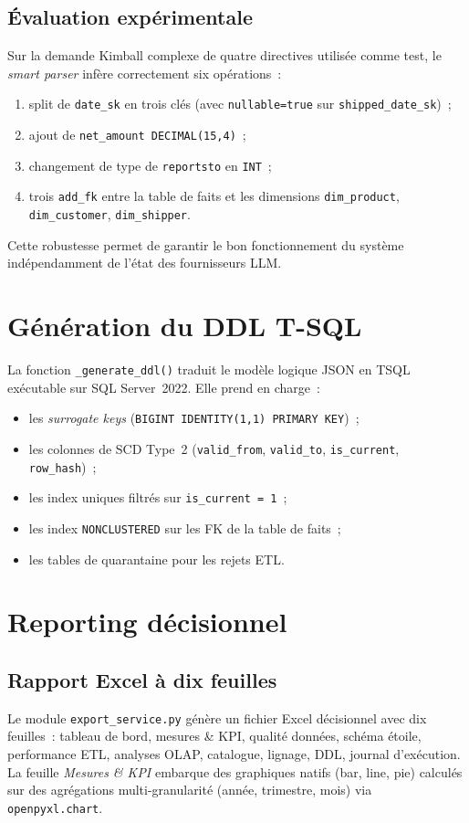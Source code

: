 \documentclass[12pt, a4paper]{report}
\begin{document}
\subsection{Évaluation expérimentale}
Sur la demande Kimball complexe de quatre directives utilisée comme
test, le \emph{smart parser} infère correctement six opérations~:
\begin{enumerate}
  \item split de \texttt{date\_sk} en trois clés (avec
        \texttt{nullable=true} sur \texttt{shipped\_date\_sk})~;
  \item ajout de \texttt{net\_amount DECIMAL(15,4)}~;
  \item changement de type de \texttt{reportsto} en \texttt{INT}~;
  \item trois \texttt{add\_fk} entre la table de faits et les
        dimensions \texttt{dim\_product}, \texttt{dim\_customer},
        \texttt{dim\_shipper}.
\end{enumerate}
Cette robustesse permet de garantir le bon fonctionnement du système
indépendamment de l'état des fournisseurs \ac{LLM}.

\section{Génération du DDL T-SQL}
La fonction \texttt{\_generate\_ddl()} traduit le modèle logique \ac{JSON}
en \ac{TSQL} exécutable sur SQL Server~2022. Elle prend en charge~:
\begin{itemize}
  \item les \emph{surrogate keys} (\texttt{BIGINT IDENTITY(1,1)
        PRIMARY KEY})~;
  \item les colonnes de \ac{SCD} Type~2 (\texttt{valid\_from},
        \texttt{valid\_to}, \texttt{is\_current}, \texttt{row\_hash})~;
  \item les index uniques filtrés sur \texttt{is\_current = 1}~;
  \item les index \texttt{NONCLUSTERED} sur les \ac{FK} de la table
        de faits~;
  \item les tables de quarantaine pour les rejets ETL.
\end{itemize}

\section{Reporting décisionnel}

\subsection{Rapport Excel à dix feuilles}
Le module \texttt{export\_service.py} génère un fichier Excel décisionnel
avec dix feuilles~: tableau de bord, mesures \& KPI, qualité données,
schéma étoile, performance ETL, analyses OLAP, catalogue, lignage,
DDL, journal d'exécution. La feuille \emph{Mesures \& KPI} embarque
des graphiques natifs (bar, line, pie) calculés sur des agrégations
multi-granularité (année, trimestre, mois) via \texttt{openpyxl.chart}.
\end{document}
